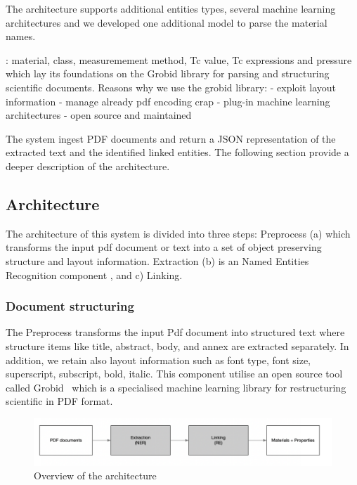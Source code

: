 \documentclass{article}
\begin{document}
The architecture supports additional entities types, several machine learning architectures and we developed one additional model to parse the material names. 

: material, class, measuremement method, Tc value, Tc expressions and pressure~\cite{foppiano2020supermat}  which lay its foundations on the Grobid library for parsing and structuring scientific documents.
Reasons why we use the grobid library: 
 - exploit layout information
 - manage already pdf encoding crap 
 - plug-in machine learning architectures 
 - open source and maintained 
 
The system ingest PDF documents and return a JSON representation of the extracted text and the identified linked entities. 
The following section provide a deeper description of the architecture. 

\subsection{Architecture}

The architecture of this system is divided into three steps: Preprocess (a) which transforms the input pdf document or text into a set of object preserving structure and layout information. Extraction (b) is an Named Entities Recognition component , and c) Linking.


\subsubsection{Document structuring}
The Preprocess transforms the input Pdf document into structured text where structure items like title, abstract, body, and annex are extracted separately. In addition, we retain also layout information such as font type, font size, superscript, subscript, bold, italic. 
This component utilise an open source tool called Grobid~\cite{GROBID} which is a specialised machine learning library for restructuring scientific in PDF format. 




\begin{figure}[ht]
\includegraphics[width=\textwidth]{overview-schema}
\caption{Overview of the architecture}
\end{figure}
\end{document}
